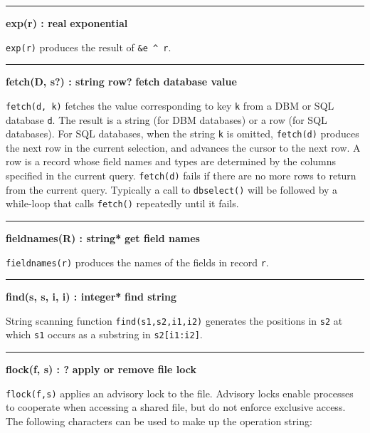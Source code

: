 \bigskip\hrule\vspace{0.1cm}
\noindent
{\bf exp(r) : real } \hfill {\bf exponential}

\noindent
{}\texttt{exp(r)} produces the result of
\texttt{\&e \^{} r}.

\bigskip\hrule\vspace{0.1cm}
\noindent
{\bf fetch(D, s?) : string {\textbar} row? } \hfill {\bf fetch database value}

\noindent
{}\texttt{fetch(d, k)} fetches the value
corresponding to key \texttt{k} from a DBM or
SQL database \texttt{d}. The result is
a string (for DBM databases) or a row (for SQL databases). For SQL
databases, when the string \texttt{k} is omitted,
\texttt{fetch(d)} produces the next row \WarningNotThreadSafe
in the current selection, and advances the cursor to the next row. A
row is a record whose field names and types are determined by the
columns specified in the current query. \texttt{fetch(d)} fails if there are no
more rows to return from the current query. Typically a call to
\texttt{dbselect()} will be followed by a while{}-loop that calls
\texttt{fetch()} repeatedly until it fails.

\bigskip\hrule\vspace{0.1cm}
\noindent
{\bf fieldnames(R) : string* } \hfill {\bf get field names}

\noindent
{}\texttt{fieldnames(r)} produces the names of the fields in
record \texttt{r}.

\bigskip\hrule\vspace{0.1cm}
\noindent
{\bf find(s, s, i, i) : integer* } \hfill {\bf find string}

\noindent
{}String scanning function \texttt{find(s1,s2,i1,i2)} generates
the positions in \texttt{s2} at which \texttt{s1} occurs as a
substring in \texttt{s2[i1:i2]}.

\bigskip\hrule\vspace{0.1cm}
\noindent
{\bf flock(f, s) : ? } \hfill {\bf apply or remove file lock}\WarningNotThreadSafe

\noindent
{}\texttt{flock(f,s)} applies an advisory
lock to the file. Advisory locks enable processes to
cooperate when accessing a shared file, but do not enforce exclusive
access. The following characters can be used to make up the operation
string: 

